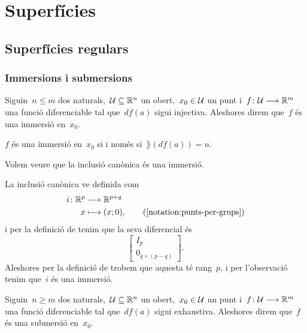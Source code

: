 \documentclass[../geometria-diferencial.tex]{subfiles}
\begin{document}
\chapter{Superfícies}
\section{Superfícies regulars}
    \subsection{Immersions i submersions}
    \begin{definition}[Immersió]
        \label{def:immersio}
        Siguin~\(n\leq m\) dos naturals,~\(\mathcal{U}\subseteq\mathbb{R}^{n}\) un obert,~\(x_{0}\in\mathcal{U}\) un punt i~\(f\colon\mathcal{U}\longrightarrow\mathbb{R}^{m}\) una funció diferenciable tal que~\(df(a)\) sigui injectiva.
        Aleshores direm que~\(f\) és una immersió en~\(x_{0}\).
    \end{definition}
    \begin{observation} %
        \label{obs:immersio-si-i-nomes-si-te-rang-maximal}
        \(f\) és una immersió en~\(x_{0}\) si i només si~\(\rang(df(a))=n\).
    \end{observation}
    \begin{example}
        \label{ex:la-inclusio-canonica-es-una-immersio}
        Volem veure que la inclusió canònica és una immersió.
    \end{example}
    \begin{solution}
        La inclusió canònica ve definida com
        \begin{align*}
            i\colon\mathbb{R}^{p}&\longrightarrow\mathbb{R}^{p+q} \\
            x&\longmapsto(x;0), \tag{\ref{notation:punts-per-grups}}
        \end{align*}
        i per la definició de  tenim que la seva diferencial és
        \[\left[\begin{array}{c}
            I_{p} \\\hline
            0_{q\times(p-q)}
        \end{array}\right].\]
        Aleshores per la definició de  trobem que aquesta té rang~\(p\), i per l'observació  tenim que~\(i\) és una immersió.
    \end{solution}
    \begin{definition}[Submersió]
        \label{def:submersio}
        Siguin~\(n\geq m\) dos naturals,~\(\mathcal{U}\subseteq\mathbb{R}^{n}\) un obert,~\(x_{0}\in\mathcal{U}\) un punt i~\(f\colon\mathcal{U}\longrightarrow\mathbb{R}^{m}\) una funció diferenciable tal que~\(df(a)\) sigui exhaustiva.
        Aleshores direm que~\(f\) és una submersió en~\(x_{0}\).
    \end{definition}
\end{document}
